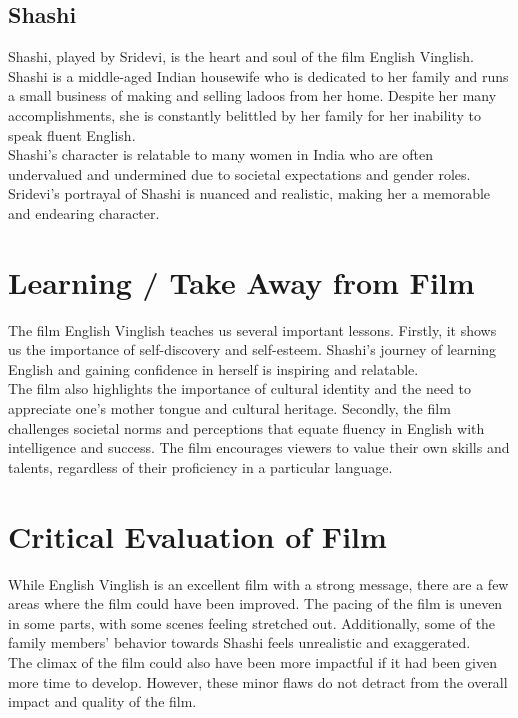 \documentclass[11pt]{article}
\begin{document}
\subsection*{Shashi}


Shashi, played by Sridevi, is the heart and soul of the film English Vinglish. Shashi is a middle-aged Indian housewife who is dedicated to her family and runs a small business of making and selling ladoos from her home. Despite her many accomplishments, she is constantly belittled by her family for her inability to speak fluent English. \\

Shashi's character is relatable to many women in India who are often undervalued and undermined due to societal expectations and gender roles. Sridevi's portrayal of Shashi is nuanced and realistic, making her a memorable and endearing character.

\section{Learning / Take Away from Film}

The film English Vinglish teaches us several important lessons. Firstly, it shows us the importance of self-discovery and self-esteem. Shashi's journey of learning English and gaining confidence in herself is inspiring and relatable.\\

The film also highlights the importance of cultural identity and the need to appreciate one's mother tongue and cultural heritage. Secondly, the film challenges societal norms and perceptions that equate fluency in English with intelligence and success. The film encourages viewers to value their own skills and talents, regardless of their proficiency in a particular language.

\section{Critical Evaluation of Film}


While English Vinglish is an excellent film with a strong message, there are a few areas where the film could have been improved. The pacing of the film is uneven in some parts, with some scenes feeling stretched out. Additionally, some of the family members' behavior towards Shashi feels unrealistic and exaggerated. \\

The climax of the film could also have been more impactful if it had been given more time to develop. However, these minor flaws do not detract from the overall impact and quality of the film.
\end{document}
